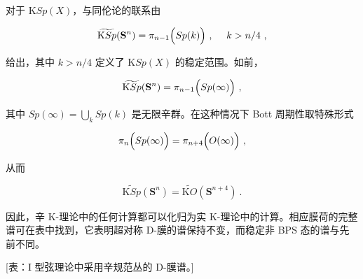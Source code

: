 \documentclass[11pt,a4paper]{ctexart}
\begin{document}
对于 \({\mathrm KSp}(X)\)，与同伦论的联系由

\[\widetilde{{\mathrm KSp}}({\mathbf S}^n)=\pi_{n-1}\Bigl(Sp(k)\Bigr) \ , \ \ \ \ k>n/4\ ,\]

给出，其中 \(k>n/4\) 定义了 \({\mathrm KSp}(X)\) 的稳定范围。如前，

\[\widetilde{{\mathrm KSp}}({\mathbf S}^n)=\pi_{n-1}\Bigl(Sp(\infty)\Bigr)\ ,\]

其中 \(Sp(\infty)=\bigcup_kSp(k)\) 是无限辛群。在这种情况下 Bott 周期性取特殊形式

\[\pi_n\Bigl(Sp(\infty)\Bigr)=\pi_{n+4}\Bigl(O(\infty)\Bigr)\ ,\]

从而

\[\widetilde{{\mathrm KSp}}({\mathbf S}^n)=\widetilde{{\mathrm KO}}({\mathbf S}^{n+4})\ .\]

因此，辛 K-理论中的任何计算都可以化归为实 K-理论中的计算。相应膜荷的完整谱可在表中找到，它表明超对称 D-膜的谱保持不变，而稳定非 BPS 态的谱与先前不同。

{[}表：I 型弦理论中采用辛规范丛的 D-膜谱。{]}
\end{document}
